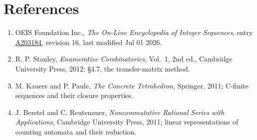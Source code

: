 \documentclass[11pt]{article}
\theoremstyle{definition}
\begin{document}
\section{References}

\begin{enumerate}

\item OEIS Foundation Inc., \emph{The On-Line Encyclopedia of Integer Sequences}, entry \href{https://oeis.org/A203184}{A203184}, revision 16, last modified Jul 01 2026.

\item R. P. Stanley, \emph{Enumerative Combinatorics}, Vol.~1, 2nd ed., Cambridge University Press, 2012; \S4.7, the transfer-matrix method.

\item M. Kauers and P. Paule, \emph{The Concrete Tetrahedron}, Springer, 2011; C-finite sequences and their closure properties.

\item J. Berstel and C. Reutenauer, \emph{Noncommutative Rational Series with Applications}, Cambridge University Press, 2011; linear representations of counting automata and their reduction.

\end{enumerate}
\end{document}
